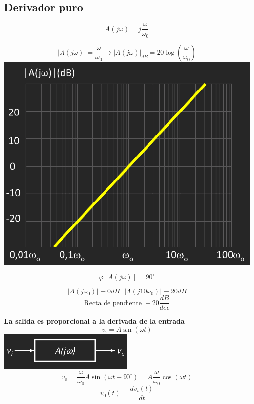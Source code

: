 \documentclass{article}
\begin{document}
\subsection{Derivador puro}
$$
A (j \omega) = j \frac{\omega}{\omega_0}
$$
\begin{minipage}{0.45\textwidth}
$$
|A (j \omega)| = \frac{\omega}{\omega_0} \to |A (j \omega)|_{dB} = 20 \log \left(\frac{\omega}{\omega_0}\right)
$$
    \centering
    \includegraphics[width=\textwidth]{figbode221.jpg} 
\end{minipage}
\begin{minipage}{0.45\textwidth}
\vspace{-2cm}
$$
\varphi [A (j \omega)] = 90^\circ
$$

\vspace{1cm}

$$
|A (j \omega_0)| = 0 dB \ \ \ |A (j 10 \omega_0)| = 20 dB
$$
$$
\text{Recta de pendiente } +20 \frac{dB}{dec}
$$
\end{minipage}
\newpage
\begin{minipage}{0.49\textwidth}
\textbf{La salida es proporcional a la derivada de la entrada}
$$
v_{i} = A \sin (\omega t)
$$
    \centering
    \includegraphics[width=0.5\textwidth]{bloquefdt.jpg} 
$$
v_{o} = \frac{\omega}{\omega_0} A \sin (\omega t + 90^\circ) = A \frac{\omega}{\omega_0} \cos (\omega t)
$$
$$
v_{0} (t) = \frac{dv_i (t)}{dt}
$$
\end{minipage}
\end{document}
